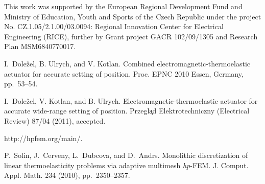 This work was supported by the European Regional Development Fund and Ministry of Education, Youth and Sports of the Czech Republic under the project No. CZ.1.05/2.1.00/03.0094: Regional Innovation Center for Electrical Engineering (RICE), further by Grant project GACR 102/09/1305 and Research Plan MSM6840770017.


\begin{thebibliography}{10}

{\sc I.~Dole\v{z}el, B. Ulrych, and V. Kotlan}. {Combined
electromagnetic-thermoelastic actuator for accurate
setting of position}. Proc. EPNC 2010 Essen, Germany, pp.~53--54.

{\sc I.~Dole\v{z}el, V. Kotlan, and B. Ulrych}. {Electromagnetic-thermoelastic
actuator for accurate wide-range setting of position}. Przegl\c{a}d
Elektrotechniczny (Electrical Review) 87/04 (2011), accepted.

{http://hpfem.org/main/}.

{\sc P.~Solin, J.~Cerveny, L.~Dubcova, and D.~Andrs}. {Monolithic discretization
of linear thermoelasticity problems via adaptive multimesh \textit{hp}-FEM}.
J. Comput. Appl. Math. 234 (2010), pp.~2350--2357.

\end{thebibliography}